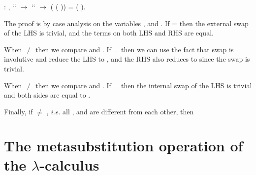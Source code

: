 \begin{coqdoccode}
\coqdocemptyline
\coqdocnoindent
{} : \coqdockw{\ensuremath{\forall}}    ,  ``   \ensuremath{\rightarrow}  ``   \ensuremath{\rightarrow} (   (   )) = (   ).\coqdoceol
\end{coqdoccode}
 The proof is by case analysis on the variables ,  and . If  =  then  the external swap of the LHS is trivial, and the terms on both LHS and RHS are equal. 
\begin{coqdoccode}
\end{coqdoccode}
When  \ensuremath{\not=}  then we compare  and . If  =  then we can use the fact that swap is involutive and reduce the LHS to , and the RHS also reduces to  since the swap is trivial. 
\begin{coqdoccode}
\end{coqdoccode}
When  \ensuremath{\not=}  then we compare  and . If  =  then the internal swap of the LHS is trivial and both sides are equal to    . 
\begin{coqdoccode}
\end{coqdoccode}
Finally, if  \ensuremath{\not=} , {\it i.e.} all ,  and  are different from each other, then 
\begin{coqdoccode}
\coqdocemptyline
\end{coqdoccode}
\section{The metasubstitution operation of the $\lambda$-calculus}



